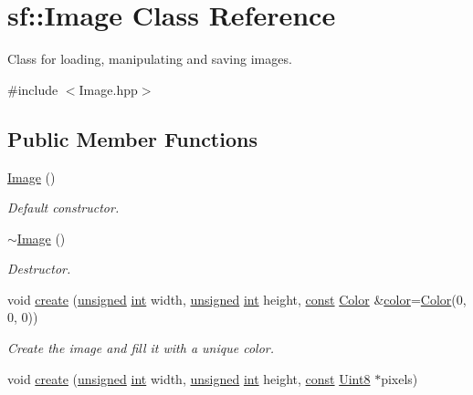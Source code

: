 \hypertarget{classsf_1_1_image}{\section{sf\-:\-:Image Class Reference}
\label{classsf_1_1_image}
}


Class for loading, manipulating and saving images.  




{\ttfamily \#include $<$Image.\-hpp$>$}

\subsection*{Public Member Functions}
\begin{DoxyCompactItemize}
\item 
\hyperlink{classsf_1_1_image_abb4caf3cb167b613345ebe36fc883f12}{Image} ()
\begin{DoxyCompactList}\small\item\em Default constructor. \end{DoxyCompactList}\item 
\hyperlink{classsf_1_1_image_a0ba22a38e6c96e3b37dd88198046de83}{$\sim$\-Image} ()
\begin{DoxyCompactList}\small\item\em Destructor. \end{DoxyCompactList}\item 
void \hyperlink{classsf_1_1_image_a2a67930e2fd9ad97cf004e918cf5832b}{create} (\hyperlink{curses_8priv_8h_aca40206900cfc164654362fa8d4ad1e6}{unsigned} \hyperlink{term__entry_8h_ad65b480f8c8270356b45a9890f6499ae}{int} width, \hyperlink{curses_8priv_8h_aca40206900cfc164654362fa8d4ad1e6}{unsigned} \hyperlink{term__entry_8h_ad65b480f8c8270356b45a9890f6499ae}{int} height, \hyperlink{term__entry_8h_a57bd63ce7f9a353488880e3de6692d5a}{const} \hyperlink{classsf_1_1_color}{Color} \&\hyperlink{_entity_8cpp_a864889304a90873adb9c6e289a54bcf4}{color}=\hyperlink{classsf_1_1_color}{Color}(0, 0, 0))
\begin{DoxyCompactList}\small\item\em Create the image and fill it with a unique color. \end{DoxyCompactList}\item 
void \hyperlink{classsf_1_1_image_a1c2b960ea12bdbb29e80934ce5268ebf}{create} (\hyperlink{curses_8priv_8h_aca40206900cfc164654362fa8d4ad1e6}{unsigned} \hyperlink{term__entry_8h_ad65b480f8c8270356b45a9890f6499ae}{int} width, \hyperlink{curses_8priv_8h_aca40206900cfc164654362fa8d4ad1e6}{unsigned} \hyperlink{term__entry_8h_ad65b480f8c8270356b45a9890f6499ae}{int} height, \hyperlink{term__entry_8h_a57bd63ce7f9a353488880e3de6692d5a}{const} \hyperlink{namespacesf_a4ef3d630785c4f296f9b4f274c33d78e}{Uint8} $\ast$pixels)

\end{DoxyCompactItemize}
